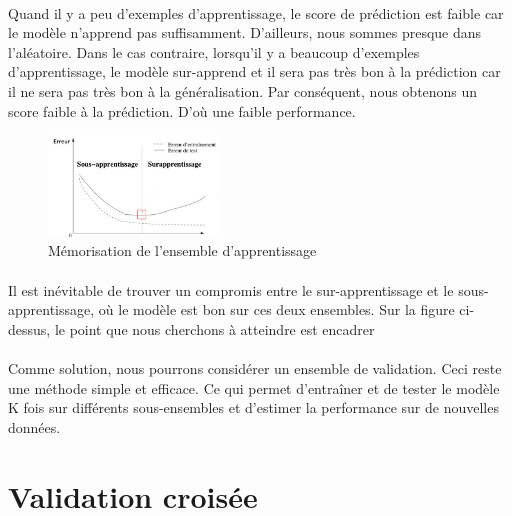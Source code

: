 \documentclass{report}
\begin{document}
\paragraph{}
Quand il y a peu d'exemples d'apprentissage, le score de prédiction est faible car le modèle n'apprend pas suffisamment. D'ailleurs, nous sommes presque dans l'aléatoire. Dans le cas contraire, lorsqu'il y a beaucoup d'exemples d'apprentissage, le modèle sur-apprend et il sera pas très bon à la prédiction car il ne sera pas très bon à la généralisation. Par conséquent, nous obtenons un score faible à la prédiction. D'où une faible performance.

\begin{figure}[H]
  \begin{center}
    \includegraphics[width=0.4\textwidth]{apprentissage.png}
    \caption{Mémorisation de l'ensemble d'apprentissage}
  \end{center}
\end{figure}
\paragraph{}
Il est inévitable de trouver un compromis entre le sur-apprentissage et le sous-apprentissage, où le modèle est bon sur ces deux ensembles. Sur la figure ci-dessus, le point que nous cherchons à atteindre est encadrer 

\paragraph{}
Comme solution, nous pourrons considérer un ensemble de validation. Ceci reste une méthode simple et efficace. Ce qui permet d'entraîner et de tester le modèle K fois sur différents sous-ensembles et d'estimer la performance sur de nouvelles données.


\section{Validation croisée}
\end{document}
